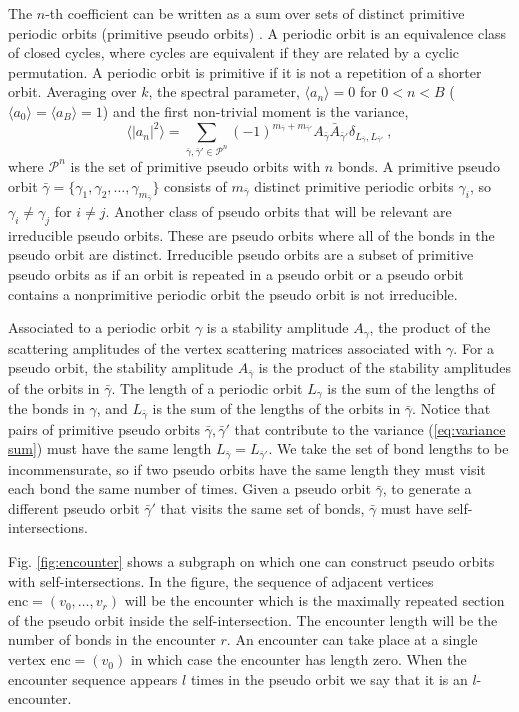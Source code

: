 \documentclass[doublecol]{epl2}
\newcommand{\bg}{\bar{\gamma}}
\newcommand{\enc}{\mathrm{enc}}
\begin{document}
The $n$-th coefficient can be written as a sum over sets of distinct primitive periodic orbits (primitive pseudo orbits) \cite{BHJ12}.  A periodic orbit is an equivalence class of closed cycles, where cycles are equivalent if they are related by a cyclic permutation.  A periodic orbit is primitive if it is not a repetition of a shorter orbit.  
Averaging over $k$, the spectral parameter, $\langle a_n \rangle=0$ for $0<n<B$ ($\langle a_0 \rangle=\langle a_B \rangle=1$) and the first non-trivial moment is the variance,
\begin{equation}
\langle |a_n|^2 \rangle
= \sum_{\bg, \bg' \in \mathcal{P}^n} 
(-1)^{m_{\bg}+m_{\bg'}} 
A_{\bg} \bar{A}_{\bg'}   
\delta_{L_{\bg}, L_{\bg'}} \ ,
\label{eq:variance sum} 
\end{equation}		
where $\mathcal{P}^n$ is the set of primitive pseudo orbits with $n$ bonds.  A primitive pseudo orbit $\bg=\{\gamma_1, \gamma_2, \dots, \gamma_{m_{\bg}}\}$ 
consists of $m_{\bg}$ distinct primitive periodic orbits $\gamma_i$, so $\gamma_i \neq \gamma_j$ for $i\neq j$.    Another class of pseudo orbits that will be relevant are irreducible pseudo orbits.  These are pseudo orbits where all of the bonds in the pseudo orbit are distinct.  Irreducible pseudo orbits are a subset of primitive pseudo orbits as if an orbit is repeated in a pseudo orbit or a pseudo orbit contains a nonprimitive periodic orbit the pseudo orbit is not irreducible.   

Associated to a periodic orbit $\gamma$ is a stability amplitude $A_{\gamma}$, the product of the scattering amplitudes of the vertex scattering matrices associated with $\gamma$.  For a pseudo orbit, the stability amplitude $A_{\bg}$ is the product of the stability amplitudes of the orbits in $\bg$. 
The length of a periodic orbit $L_{\gamma}$ is the sum of the lengths of the bonds in $\gamma$, and $L_{\bg}$ is the sum of the lengths of the orbits in $\bg$.  Notice that pairs of primitive pseudo orbits $\bg, \bg'$ that contribute to the variance (\ref{eq:variance sum}) must have the same length $L_{\bg}=L_{\bg'}$.
We take the set of bond lengths to be incommensurate, so if two pseudo orbits have the same length they must visit each bond the same number of times.  
Given a pseudo orbit $\bg$, to generate a different pseudo orbit $\bg'$ that visits the same set of bonds, $\bg$ must have self-intersections.  

Fig. \ref{fig:encounter} shows a subgraph on which one can construct pseudo orbits with self-intersections.  In the figure, the sequence of adjacent vertices $\enc=(v_0,\dots,v_{r})$ will be the encounter which is the maximally repeated section of the pseudo orbit inside the self-intersection.   The encounter length will be the number of bonds in the encounter $r$.  An encounter can take place at a single vertex $\enc=(v_0)$ in which case the encounter has length zero.  When the encounter sequence appears $l$ times in the pseudo orbit we say that it is an $l$-encounter.
\end{document}
